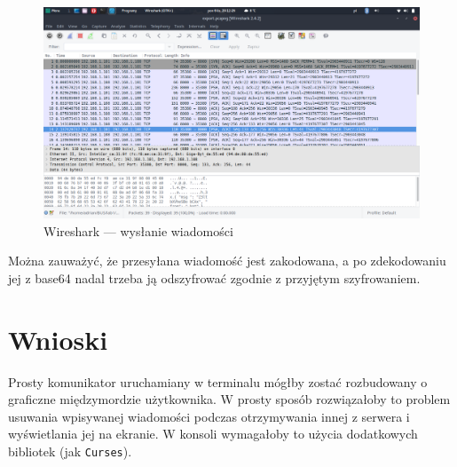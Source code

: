 \documentclass[a4paper]{article}
\begin{document}
\begin{figure}[H]
	\center
\includegraphics[width=.8\textwidth]{img/7-msg.png}
\caption{Wireshark --- wysłanie wiadomości}
\end{figure}

Można zauważyć, że przesyłana wiadomość jest zakodowana, a po zdekodowaniu jej z base64 nadal trzeba ją odszyfrować zgodnie z przyjętym szyfrowaniem.

\section{Wnioski}
Prosty komunikator uruchamiany w terminalu mógłby zostać rozbudowany o graficzne międzymordzie użytkownika. W prosty sposób rozwiązałoby to problem usuwania wpisywanej wiadomości podczas otrzymywania innej z serwera i wyświetlania jej na ekranie. W konsoli wymagałoby to użycia dodatkowych bibliotek (jak \texttt{Curses}).
\end{document}
